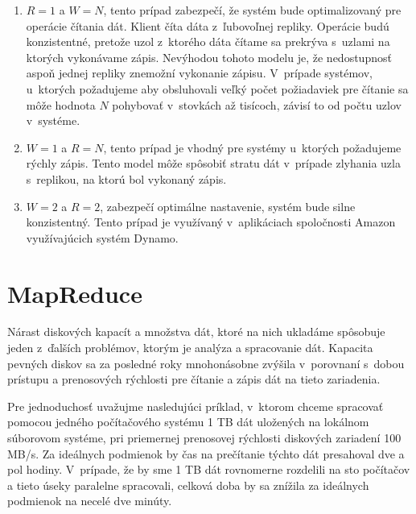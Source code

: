 \documentclass[11pt,twoside,a4paper]{book}
\begin{document}
\begin{enumerate}
 \item $R = 1$ a $W = N$, tento prípad zabezpečí, že systém bude optimalizovaný pre operácie čítania dát. Klient číta dáta z~ľubovoľnej repliky. Operácie budú konzistentné, pretože uzol z~ktorého dáta čítame sa prekrýva s~uzlami na ktorých vykonávame zápis. Nevýhodou tohoto modelu je, že nedostupnosť aspoň jednej repliky znemožní vykonanie zápisu. V~prípade systémov, u~ktorých požadujeme aby obsluhovali veľký počet požiadaviek pre čítanie sa môže hodnota $N$ pohybovať v~stovkách až tisícoch, závisí to od počtu uzlov v~systéme.
 \item $W = 1$ a $R = N$, tento prípad je vhodný pre systémy u~ktorých požadujeme rýchly zápis. Tento model môže spôsobiť stratu dát v~prípade zlyhania uzla s~replikou, na ktorú bol vykonaný zápis.
 \item $W = 2$ a $R = 2$, zabezpečí optimálne nastavenie, systém bude silne konzistentný. Tento prípad je využívaný v~aplikáciach spoločnosti Amazon využívajúcich systém Dynamo.
\end{enumerate}


\section{MapReduce}

Nárast diskových kapacít a množstva dát, ktoré na nich ukladáme spôsobuje jeden z~ďalších problémov, ktorým je analýza a spracovanie dát. Kapacita pevných diskov sa za posledné roky mnohonásobne zvýšila v~porovnaní s~dobou prístupu a prenosových rýchlosti pre čítanie a zápis dát na tieto zariadenia.

Pre jednoduchosť uvažujme nasledujúci príklad, v~ktorom chceme spracovať pomocou jedného počítačového systému 1 TB dát uložených na lokálnom súborovom systéme, pri priemernej prenosovej rýchlosti diskových zariadení 100 MB/s. Za ideálnych podmienok by čas na prečítanie týchto dát presahoval dve a pol hodiny. V~prípade, že by sme 1 TB dát rovnomerne rozdelili na sto počítačov a tieto úseky paralelne spracovali, celková doba by sa znížila za ideálnych podmienok na necelé dve minúty. 
\end{document}
